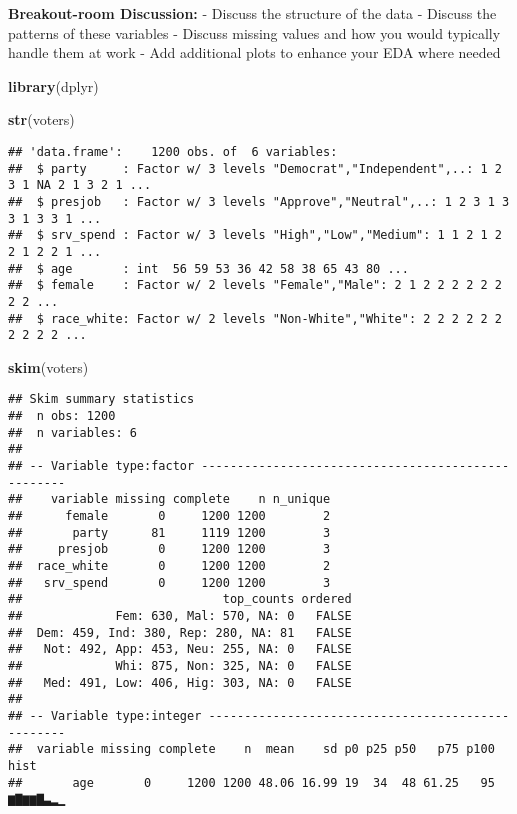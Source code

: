 \documentclass[]{article}
\newenvironment{Shaded}{\begin{snugshade}}{\end{snugshade}}
\newcommand{\KeywordTok}[1]{\textcolor[rgb]{0.13,0.29,0.53}{\textbf{{#1}}}}
\newcommand{\NormalTok}[1]{{#1}}
\begin{document}
\textbf{Breakout-room Discussion:} - Discuss the structure of the data -
Discuss the patterns of these variables - Discuss missing values and how
you would typically handle them at work - Add additional plots to
enhance your EDA where needed

\begin{Shaded}
\begin{Highlighting}[]
\KeywordTok{library}\NormalTok{(dplyr)}

\KeywordTok{str}\NormalTok{(voters)}
\end{Highlighting}
\end{Shaded}

\begin{verbatim}
## 'data.frame':    1200 obs. of  6 variables:
##  $ party     : Factor w/ 3 levels "Democrat","Independent",..: 1 2 3 1 NA 2 1 3 2 1 ...
##  $ presjob   : Factor w/ 3 levels "Approve","Neutral",..: 1 2 3 1 3 3 1 3 3 1 ...
##  $ srv_spend : Factor w/ 3 levels "High","Low","Medium": 1 1 2 1 2 2 1 2 2 1 ...
##  $ age       : int  56 59 53 36 42 58 38 65 43 80 ...
##  $ female    : Factor w/ 2 levels "Female","Male": 2 1 2 2 2 2 2 2 2 2 ...
##  $ race_white: Factor w/ 2 levels "Non-White","White": 2 2 2 2 2 2 2 2 2 2 ...
\end{verbatim}

\begin{Shaded}
\begin{Highlighting}[]
\KeywordTok{skim}\NormalTok{(voters)}
\end{Highlighting}
\end{Shaded}

\begin{verbatim}
## Skim summary statistics
##  n obs: 1200 
##  n variables: 6 
## 
## -- Variable type:factor ---------------------------------------------------
##    variable missing complete    n n_unique
##      female       0     1200 1200        2
##       party      81     1119 1200        3
##     presjob       0     1200 1200        3
##  race_white       0     1200 1200        2
##   srv_spend       0     1200 1200        3
##                            top_counts ordered
##             Fem: 630, Mal: 570, NA: 0   FALSE
##  Dem: 459, Ind: 380, Rep: 280, NA: 81   FALSE
##   Not: 492, App: 453, Neu: 255, NA: 0   FALSE
##             Whi: 875, Non: 325, NA: 0   FALSE
##   Med: 491, Low: 406, Hig: 303, NA: 0   FALSE
## 
## -- Variable type:integer --------------------------------------------------
##  variable missing complete    n  mean    sd p0 p25 p50   p75 p100     hist
##       age       0     1200 1200 48.06 16.99 19  34  48 61.25   95 ▆▇▆▆▇▃▂▁
\end{verbatim}
\end{document}
